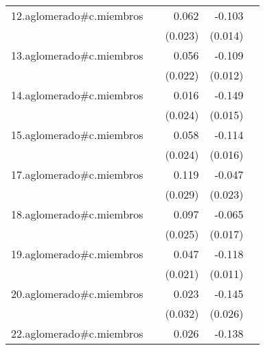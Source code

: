 {\begin{longtable}{l*{4}{D{.}{.}{-1}}}
\addlinespace
12.aglomerado#c.miembros&                     &       0.062\sym{**} &      -0.103\sym{***}&                     \\
            &                     &     (0.023)         &     (0.014)         &                     \\
\addlinespace
13.aglomerado#c.miembros&                     &       0.056\sym{**} &      -0.109\sym{***}&                     \\
            &                     &     (0.022)         &     (0.012)         &                     \\
\addlinespace
14.aglomerado#c.miembros&                     &       0.016         &      -0.149\sym{***}&                     \\
            &                     &     (0.024)         &     (0.015)         &                     \\
\addlinespace
15.aglomerado#c.miembros&                     &       0.058\sym{*}  &      -0.114\sym{***}&                     \\
            &                     &     (0.024)         &     (0.016)         &                     \\
\addlinespace
17.aglomerado#c.miembros&                     &       0.119\sym{***}&      -0.047\sym{*}  &                     \\
            &                     &     (0.029)         &     (0.023)         &                     \\
\addlinespace
18.aglomerado#c.miembros&                     &       0.097\sym{***}&      -0.065\sym{***}&                     \\
            &                     &     (0.025)         &     (0.017)         &                     \\
\addlinespace
19.aglomerado#c.miembros&                     &       0.047\sym{*}  &      -0.118\sym{***}&                     \\
            &                     &     (0.021)         &     (0.011)         &                     \\
\addlinespace
20.aglomerado#c.miembros&                     &       0.023         &      -0.145\sym{***}&                     \\
            &                     &     (0.032)         &     (0.026)         &                     \\
\addlinespace
22.aglomerado#c.miembros&                     &       0.026         &      -0.138\sym{***}&                     \\

\end{longtable}}
